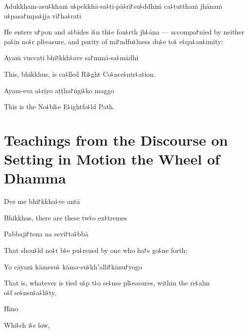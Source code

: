 Adukkham-asu꜕khaṁ u꜕pekkhā-sa꜕ti-pā꜕ri꜓su꜕ddhiṁ ca꜕tutthaṁ jhānaṁ u꜕pasa꜓mpa꜕jja vi꜓ha꜕rati

\begin{english}
  He enters u꜓pon and a꜕bides i꜕n th꜕e fou꜕rth jh꜕āna --- accompa꜓nied
  by neither pa꜕in no꜕r pl꜕easure, and purity of mi꜓ndfu꜕lness du꜕e to꜕
  e꜕qu꜕an꜕imity:
\end{english}

Ayaṁ vuccati bhi꜓kkh꜕ave sa꜓mmā-sa꜕mādhi

\begin{english}
  This, bhikkhus, is ca꜕lled Ri꜕ght Co꜕nce꜕ntr꜕ation.
\end{english}

Ayam-eva a꜕riyo aṭṭha꜓ṅgi꜕ko maggo

\begin{english}
  This is the No꜕bl꜕e E꜕ightfo꜕ld Path.
\end{english}

\chapter[The Wheel of Dhamma]{Teachings from the Discourse on Setting in Motion the Wheel of Dhamma}%


\begin{leader}
\end{leader}

Dve me bhi꜓kkha꜕ve antā

\begin{english}
  Bhikkhus, there are these tw꜕o ex꜕tremes
\end{english}

Pabbaji꜓tena na sevi꜓ta꜕bbā

\begin{english}
  That shou꜕ld no꜕t b꜕e pu꜕rsued by one who ha꜓s go꜕ne forth:
\end{english}

Yo cāyaṁ kāmesu꜕ kāma-su꜕kh'alli꜓kānu꜓yogo

\begin{english}
  That is, whatever is tied u꜕p t꜕o se꜕nse pl꜕easures, within the re꜕alm\\ o꜕f se꜕nsu꜕a꜕li꜕ty,
\end{english}

Hīno

\begin{english}
  Whi꜕ch i꜕s low,
\end{english}

